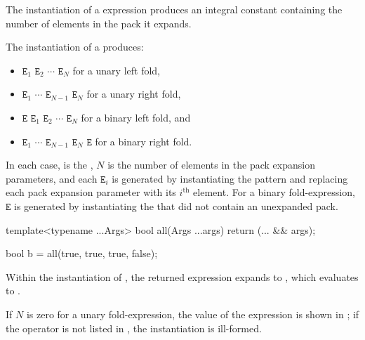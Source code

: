 \pnum
The instantiation of a  expression produces
an integral constant containing the number of elements in the pack
it expands.

\pnum
The instantiation of a  produces:

\begin{itemize}
\item
\tcode{((}$\mathtt{E}_1$
            $\mathtt{E}_2$\tcode{)}
            $\cdots$\tcode{)}
            $\mathtt{E}_N$
for a unary left fold,
\item
         $\mathtt{E}_1$     
\tcode{(}$\cdots$           
\tcode{(}$\mathtt{E}_{N-1}$ 
         $\mathtt{E}_N$\tcode{))}
for a unary right fold,
\item
\tcode{(((}$\mathtt{E}$
             $\mathtt{E}_1$\tcode{)}
             $\mathtt{E}_2$\tcode{)}
             $\cdots$\tcode{)}
             $\mathtt{E}_N$
for a binary left fold, and
\item
         $\mathtt{E}_1$     
\tcode{(}$\cdots$           
\tcode{(}$\mathtt{E}_{N-1}$ 
\tcode{(}$\mathtt{E}_{N}$   
         $\mathtt{E}$\tcode{)))}
for a binary right fold.
\end{itemize}

In each case,
 is the ,
$N$ is the number of elements in the pack expansion parameters,
and each $\mathtt{E}_i$ is generated by instantiating the pattern
and replacing each pack expansion parameter with its $i^\text{th}$ element.
For a binary fold-expression,
$\mathtt{E}$ is generated
by instantiating the 
that did not contain an unexpanded pack.
\begin{example}
\begin{codeblock}
template<typename ...Args>
  bool all(Args ...args) { return (... && args); }

bool b = all(true, true, true, false);
\end{codeblock}
Within the instantiation of ,
the returned expression expands to
,
which evaluates to .
\end{example}
If $N$ is zero for a unary fold-expression,
the value of the expression is shown in ;
if the operator is not listed in ,
the instantiation is ill-formed.

